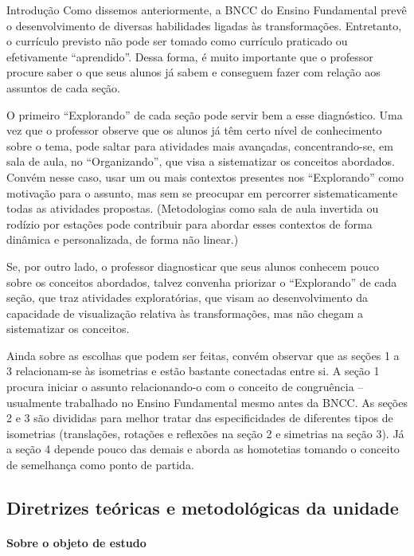 \begin{apresentacao}{Introdução}
Como dissemos anteriormente, a BNCC do Ensino Fundamental prevê o desenvolvimento de diversas habilidades ligadas às transformações. Entretanto, o currículo previsto não pode ser tomado como currículo praticado ou efetivamente “aprendido”. Dessa forma, é muito importante que o professor procure saber o que seus alunos já sabem e conseguem fazer com relação aos assuntos de cada seção. 
	
O primeiro “Explorando” de cada seção pode servir bem a esse diagnóstico. Uma vez que o professor observe que os alunos já têm certo nível de conhecimento sobre o tema, pode saltar para atividades mais avançadas, concentrando-se, em sala de aula, no “Organizando”, que visa a sistematizar os conceitos abordados. Convém nesse caso, usar um ou mais contextos presentes nos “Explorando” como motivação para o assunto, mas sem se preocupar em percorrer sistematicamente todas as atividades propostas. (Metodologias como sala de aula invertida ou rodízio por estações pode contribuir para abordar esses contextos de forma dinâmica e personalizada, de forma não linear.)

Se, por outro lado, o professor diagnosticar que seus alunos conhecem pouco sobre os conceitos abordados, talvez convenha priorizar o “Explorando” de cada seção, que traz atividades exploratórias, que visam ao desenvolvimento da capacidade de visualização relativa às transformações, mas não chegam a sistematizar os conceitos. 

Ainda sobre as escolhas que podem ser feitas, convém observar que as seções 1 a 3 relacionam-se às isometrias e estão bastante conectadas entre si. A seção 1 procura iniciar o assunto relacionando-o com o conceito de congruência – usualmente trabalhado no Ensino Fundamental mesmo antes da BNCC. As seções 2 e 3 são divididas para melhor tratar das especificidades de diferentes tipos de isometrias (translações, rotações e reflexões na seção 2 e simetrias na seção 3). Já a seção 4 depende pouco das demais e aborda as homotetias tomando o conceito de semelhança como ponto de partida.
\clearpage

\subsection{Diretrizes teóricas e metodológicas da unidade}
\paragraph{Sobre o objeto de estudo}


\end{apresentacao}
